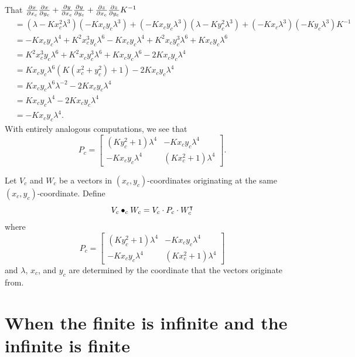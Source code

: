 \documentclass{ximera}
\begin{document}
\begin{problem}
\begin{freeResponse}
    That $\pp[x]{x_c}\pp[x]{y_c} + \pp[y]{x_c}\pp[y]{y_c} + \pp[z]{x_c}\pp[z]{y_c} K^{-1}$
    \begin{align*}
      &=\left(\lambda -Kx_c^2 \lambda^3\right)\left(-Kx_cy_c \lambda^3\right) + \left(-Kx_cy_c \lambda^3\right)\left(\lambda - Ky_c^2 \lambda^3\right) + \left(-Kx_c \lambda^3\right)\left(-Ky_c \lambda^3\right)K^{-1}\\
      &= -Kx_cy_c\lambda^4+K^2x_c^3y_c\lambda^6-Kx_cy_c\lambda^4+K^2x_cy_c^3\lambda^6+Kx_cy_c\lambda^6\\
      &= K^2x_c^3y_c\lambda^6+K^2x_cy_c^3\lambda^6+Kx_cy_c\lambda^6 -2Kx_cy_c\lambda^4\\
      &= Kx_cy_c\lambda^6\left(K\left(x_c^2 + y_c^2\right) + 1\right)-2Kx_cy_c\lambda^4\\
      &= Kx_cy_c\lambda^6\lambda^{-2} -2Kx_cy_c\lambda^4\\
      &= Kx_cy_c\lambda^4 -2Kx_cy_c\lambda^4\\
      &= -Kx_cy_c\lambda^4.
    \end{align*}
    With entirely analogous computations, we see that 
    \[
     P_c =
     \begin{bmatrix}
       \left(Ky_c^2+1\right)\lambda^4 & -Kx_{c}y_{c}\lambda^4\\
       -Kx_{c}y_{c}\lambda^4 & \left(Kx_c^2+1\right)\lambda^4
     \end{bmatrix}.
     \]
  \end{freeResponse}
\end{problem}


\begin{definition}
  Let $V_c$ and $W_c$ be a vectors in $(x_c,y_c)$-coordinates
  originating at the same $(x_c,y_c)$-coordinate. Define
  \[
  V_c \bullet_c W_c = V_c \cdot P_c \cdot W_c^\transpose
  \]
  where
  \[
  P_c =
  \begin{bmatrix}
    \left(Ky_c^2+1\right)\lambda^4 & -Kx_{c}y_{c}\lambda^4\\
    -Kx_{c}y_{c}\lambda^4 & \left(Kx_c^2+1\right)\lambda^4
  \end{bmatrix}
  \]
  and $\lambda$, $x_c$, and $y_c$ are determined by the
  coordinate that the vectors originate from.
\end{definition}


\section{When the finite is infinite and the infinite is finite}
\end{document}
